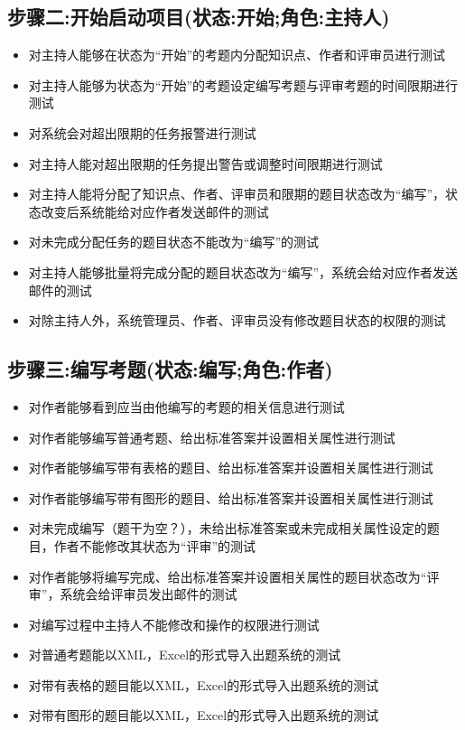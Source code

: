 \documentclass[hyperref, a4paper]{ctexart}
\providecommand{\tightlist}{%
  \setlength{\itemsep}{0pt}\setlength{\parskip}{0pt}}
\begin{document}
\hypertarget{ux6b65ux9aa4ux4e8cux5f00ux59cbux542fux52a8ux9879ux76eeux72b6ux6001ux5f00ux59cbux89d2ux8272ux4e3bux6301ux4eba}{%
\subsection{步骤二:开始启动项目(状态:开始;角色:主持人)}\label{ux6b65ux9aa4ux4e8cux5f00ux59cbux542fux52a8ux9879ux76eeux72b6ux6001ux5f00ux59cbux89d2ux8272ux4e3bux6301ux4eba}}

\begin{itemize}
\item
  对主持人能够在状态为``开始''的考题内分配知识点、作者和评审员进行测试
\item
  对主持人能够为状态为``开始''的考题设定编写考题与评审考题的时间限期进行测试
\item
  对系统会对超出限期的任务报警进行测试
\item
  对主持人能对超出限期的任务提出警告或调整时间限期进行测试
\item
  对主持人能将分配了知识点、作者、评审员和限期的题目状态改为``编写''，状态改变后系统能给对应作者发送邮件的测试
\item
  对未完成分配任务的题目状态不能改为``编写''的测试
\item
  对主持人能够批量将完成分配的题目状态改为``编写''，系统会给对应作者发送邮件的测试
\item
  对除主持人外，系统管理员、作者、评审员没有修改题目状态的权限的测试
\end{itemize}

\hypertarget{ux6b65ux9aa4ux4e09ux7f16ux5199ux8003ux9898ux72b6ux6001ux7f16ux5199ux89d2ux8272ux4f5cux8005}{%
\subsection{步骤三:编写考题(状态:编写;角色:作者)}\label{ux6b65ux9aa4ux4e09ux7f16ux5199ux8003ux9898ux72b6ux6001ux7f16ux5199ux89d2ux8272ux4f5cux8005}}

\begin{itemize}
\tightlist
\item
  对作者能够看到应当由他编写的考题的相关信息进行测试
\item
  对作者能够编写普通考题、给出标准答案并设置相关属性进行测试
\item
  对作者能够编写带有表格的题目、给出标准答案并设置相关属性进行测试
\item
  对作者能够编写带有图形的题目、给出标准答案并设置相关属性进行测试
\item
  对未完成编写（题干为空？），未给出标准答案或未完成相关属性设定的题目，作者不能修改其状态为``评审''的测试
\item
  对作者能够将编写完成、给出标准答案并设置相关属性的题目状态改为``评审''，系统会给评审员发出邮件的测试
\item
  对编写过程中主持人不能修改和操作的权限进行测试
\item
  对普通考题能以XML，Excel的形式导入出题系统的测试
\item
  对带有表格的题目能以XML，Excel的形式导入出题系统的测试
\item
  对带有图形的题目能以XML，Excel的形式导入出题系统的测试
\end{itemize}
\end{document}
